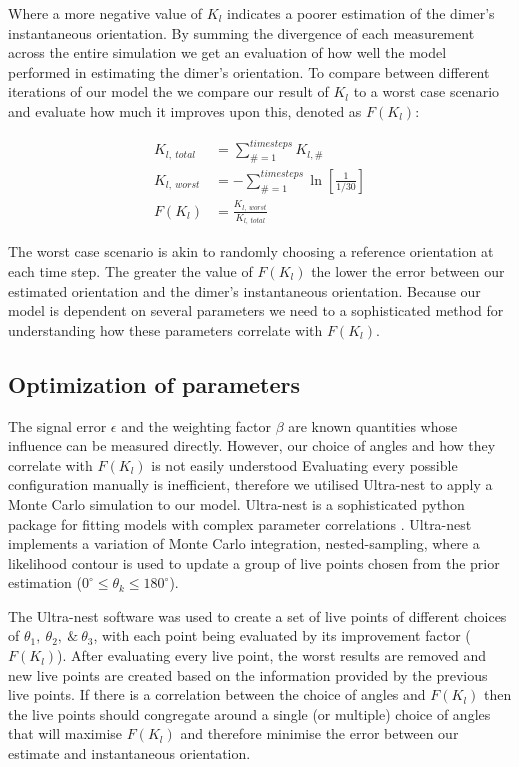 \documentclass[final, 3p]{elsarticle}
\begin{document}
Where a more negative value of $K_l$ indicates a poorer estimation of the dimer's instantaneous orientation. By summing the divergence of each measurement across the entire simulation we get an evaluation of how well the model performed in estimating the dimer's orientation. To compare between different iterations of our model the we compare our result of $K_l$ to a worst case scenario and evaluate how much it improves upon this, denoted as $F(K_l)$:

\begin{align}
	K_{l, \ total} &= \sum\limits_{\# =1}^{timesteps} K_{l,\#} \\
	K_{l, \ worst} &= -\sum\limits_{\#=1}^{timesteps} \ln \left[\frac{1}{1/30} \right] \\
	F(K_l) &= \frac{K_{l,\ worst}}{K_{l, \ total}}
\end{align}

The worst case scenario is akin to randomly choosing a reference orientation at each time step. The greater the value of $F(K_l)$ the lower the error between our estimated orientation and the dimer's instantaneous orientation. Because our model is dependent on several parameters we need to a sophisticated method for understanding how these parameters correlate with $F(K_l)$.

\subsection{Optimization of parameters}
\label{sec:2.4}
The signal error $\epsilon$ and the weighting factor $\beta$ are known quantities whose influence can be measured directly. However, our choice of angles and how they correlate with $F(K_l)$ is not easily understood Evaluating every possible configuration manually is inefficient, therefore we utilised Ultra-nest to apply a Monte Carlo simulation to our model. Ultra-nest is a sophisticated python package for fitting models with complex parameter correlations \cite{Buchner2016Ultranest}. Ultra-nest implements a variation of Monte Carlo integration, nested-sampling, where a likelihood contour is used to update a group of live points chosen from the prior estimation ($0^{\circ} \leq \theta_k \leq 180^{\circ}$).

The Ultra-nest software was used to create a set of live points of different choices of $\theta_1, \ \theta_2, \ \& \ \theta_3$, with each point being evaluated by its improvement factor ($F(K_l)$). After evaluating every live point, the worst results are removed and new live points are created based on the information provided by the previous live points. If there is a correlation between the choice of angles and $F(K_l)$ then the live points should congregate around a single (or multiple) choice of angles that will maximise $F(K_l)$ and therefore minimise the error between our estimate and instantaneous orientation. 
\end{document}

